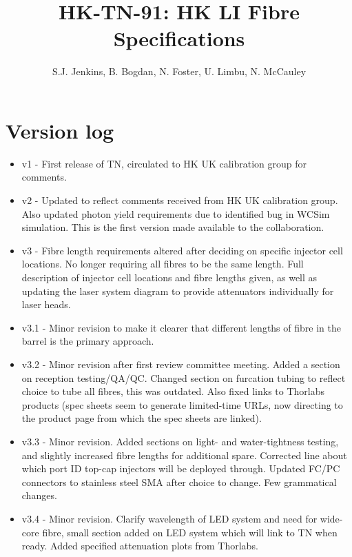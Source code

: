 \documentclass[a4paper,11pt]{article}
\begin{document}
\title{\huge{HK-TN-91: HK LI Fibre Specifications}}
\author{S.J. Jenkins, B. Bogdan, N. Foster, U. Limbu, N. McCauley}

\maketitle

\tableofcontents

\newpage

\section{Version log}
\begin{itemize}
\item v1 - First release of TN, circulated to HK UK calibration group for comments.
\item v2 - Updated to reflect comments received from HK UK calibration group. Also updated photon yield requirements due to identified bug in WCSim simulation. This is the first version made available to the collaboration.
\item v3 - Fibre length requirements altered after deciding on specific injector cell locations. No longer requiring all fibres to be the same length. Full description of injector cell locations and fibre lengths given, as well as updating the laser system diagram to provide attenuators individually for laser heads.
\item v3.1 - Minor revision to make it clearer that different lengths of fibre in the barrel is the primary approach.
\item v3.2 - Minor revision after first review committee meeting. Added a section on reception testing/QA/QC. Changed section on furcation tubing to reflect choice to tube all fibres, this was outdated. Also fixed links to Thorlabs products (spec sheets seem to generate limited-time URLs, now directing to the product page from which the spec sheets are linked). 
\item v3.3 - Minor revision. Added sections on light- and water-tightness testing, and slightly increased fibre lengths for additional spare. Corrected line about which port ID top-cap injectors will be deployed through. Updated FC/PC connectors to stainless steel SMA after choice to change. Few grammatical changes.
\item v3.4 - Minor revision. Clarify wavelength of LED system and need for wide-core fibre, small section added on LED system which will link to TN when ready. Added specified attenuation plots from Thorlabs.
\end{itemize}
\end{document}

